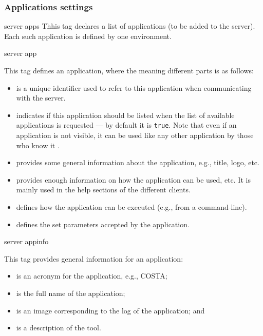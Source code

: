 \subsubsection*{Applications settings}

\bigskip
\xmlstruct
{server}
{apps}
{%
%
  Thhis tag declares a list of applications (to be added to the
  server). Each such application is defined by one 
  environment.  
%
} 


\bigskip
\xmlstruct
{server}
{app}
{%
%
  This tag defines an application, where the meaning different parts
  is as follows:
%
  \begin{itemize}

  \item {} is a unique identifier used to refer to
    this application when communicating with the server.

  \item {} indicates if this application should
    be listed when the list of available applications is requested ---
    by default it is \texttt{true}. 
    Note that even if an application is not visible, it can be used
    like any other application by those who know it
    .

  \item {} provides some general information about
    the application, e.g., title, logo, etc.

  \item {} provides enough information on how the
    application can be used, etc. It is mainly used in the help
    sections of the different clients.

  \item {} defines how the application can be
    executed (e.g., from a command-line).

  \item {} defines the set parameters accepted
    by the application.

  \end{itemize}
%
}



\bigskip
\xmlstruct
{server}
{appinfo}
{%
%
  This tag provides general information for an application:
%
  \begin{itemize}
  \item {} is an acronym for the application,
    e.g., COSTA;
  \item {} is the full name of the application;
  \item {} is an image corresponding to the log of
    the application; and
  \item {} is a description of the tool.
  \end{itemize}
%
}



